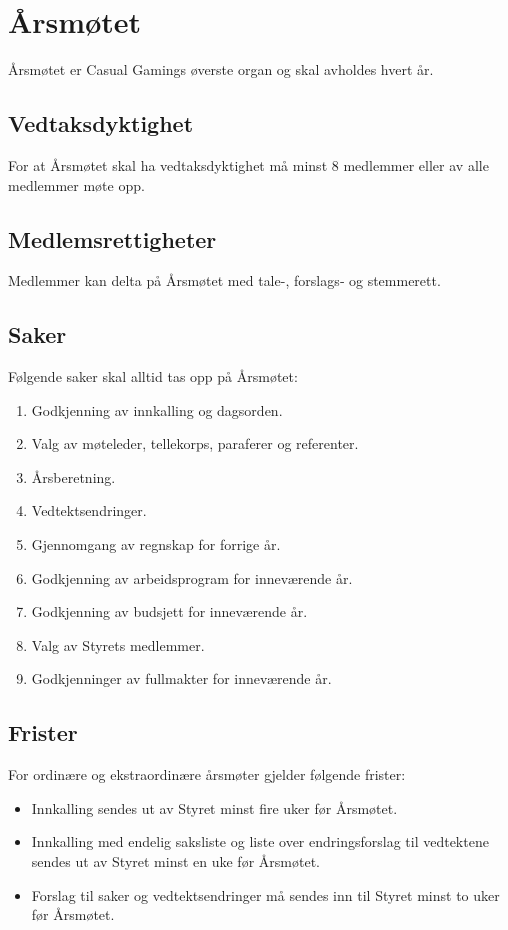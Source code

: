 \chapter{Årsmøtet}
Årsmøtet er Casual Gamings øverste organ og skal avholdes hvert år.

\section{Vedtaksdyktighet}
For at Årsmøtet skal ha vedtaksdyktighet må minst 8 medlemmer eller  av alle medlemmer møte opp.

\section{Medlemsrettigheter}
Medlemmer kan delta på Årsmøtet med tale-, forslags‐ og stemmerett.

\section{Saker}
Følgende saker skal alltid tas opp på Årsmøtet:
\begin{enumerate}
    \item Godkjenning av innkalling og dagsorden.
    \item Valg av møteleder, tellekorps, paraferer og referenter.
    \item Årsberetning.
    \item Vedtektsendringer.
    \item Gjennomgang av regnskap for forrige år.
    \item Godkjenning av arbeidsprogram for inneværende år.
    \item Godkjenning av budsjett for inneværende år.
    \item Valg av Styrets medlemmer.
    \item Godkjenninger av fullmakter for inneværende år.
\end{enumerate}

\section{Frister}
For ordinære og ekstraordinære årsmøter gjelder følgende frister:
\begin{itemize}
    \item Innkalling sendes ut av Styret minst fire uker før Årsmøtet.
    \item Innkalling med endelig saksliste og liste over endringsforslag til vedtektene sendes ut av Styret minst en uke før Årsmøtet.
    \item Forslag til saker og vedtektsendringer må sendes inn til Styret minst to uker før Årsmøtet.    
\end{itemize}

